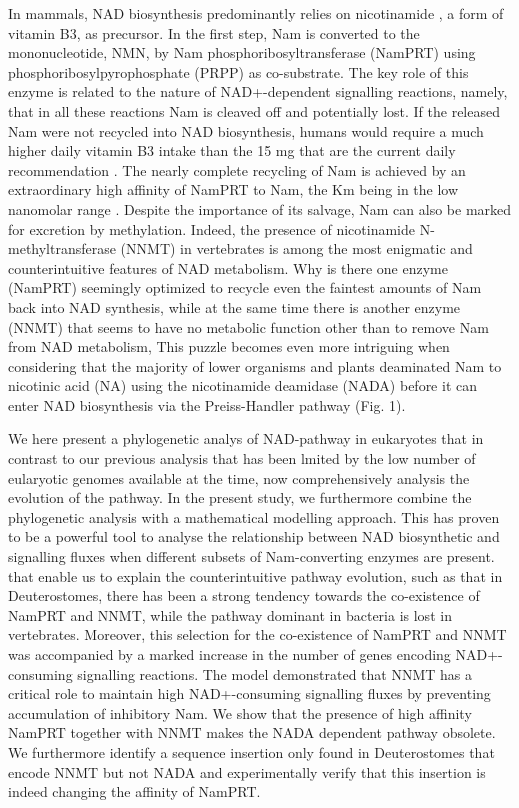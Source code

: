 In mammals, NAD biosynthesis predominantly relies on nicotinamide , a form of vitamin B3, as precursor. In the first step, Nam is converted to the mononucleotide, NMN, by Nam phosphoribosyltransferase (NamPRT) using phosphoribosylpyrophosphate (PRPP) as co-substrate. The key role of this enzyme is related to the nature of NAD+-dependent signalling reactions, namely, that in all these reactions Nam is cleaved off and potentially lost. If the released Nam were not recycled into NAD biosynthesis, humans would require a much higher daily vitamin B3 intake than the 15 mg that are the current daily recommendation . The nearly complete recycling of Nam is achieved by an extraordinary high affinity of NamPRT to Nam, the Km being in the low nanomolar range \cite{Burgos2008}. Despite the importance of its salvage, Nam can also be marked for excretion by methylation. Indeed, the presence of nicotinamide N-methyltransferase (NNMT) in vertebrates \cite{Gossmann2012} is among the most enigmatic and counterintuitive features of NAD metabolism. Why is there one enzyme (NamPRT) seemingly optimized to recycle even the faintest amounts of Nam back into NAD synthesis, while at the same time there is another enzyme (NNMT) that seems to have no metabolic function other than to remove Nam from NAD metabolism, This puzzle becomes even more intriguing when considering that the majority of lower organisms and plants deaminated Nam to nicotinic acid (NA) using the nicotinamide deamidase (NADA) before it can enter NAD biosynthesis via the Preiss-Handler pathway (Fig. 1).

We here present a phylogenetic analys of NAD-pathway in eukaryotes that in contrast to our previous analysis that has been lmited by the low number of eularyotic genomes available at the time, now comprehensively analysis the evolution of the pathway. In the present study, we furthermore combine the phylogenetic analysis with a mathematical modelling approach. This has proven to be a powerful tool to analyse the relationship between NAD biosynthetic and signalling fluxes when different subsets of Nam-converting enzymes are present. that enable us to explain the counterintuitive pathway evolution, such as that in Deuterostomes, there has been a strong tendency towards the co-existence of NamPRT and NNMT, while the pathway dominant in bacteria is lost in vertebrates. Moreover, this selection for the co-existence of NamPRT and NNMT was accompanied by a marked increase in the number of genes encoding NAD+-consuming signalling reactions. The model demonstrated that NNMT has a critical role to maintain high NAD+-consuming signalling fluxes by preventing accumulation of inhibitory Nam. We show that the presence of high affinity NamPRT together with NNMT makes the NADA dependent pathway obsolete. We furthermore identify a sequence insertion only found in Deuterostomes that encode NNMT but not NADA and experimentally verify that this insertion is indeed changing the affinity of NamPRT.


